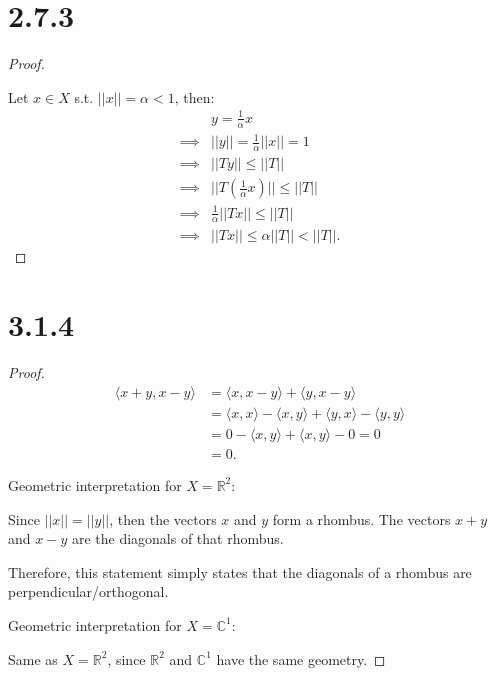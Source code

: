 \documentclass{article}
\begin{document}
\section*{2.7.3}
\begin{proof}
  $ $
  
  Let $x \in X$ s.t. $||x|| = \alpha < 1$, then:
  \begin{align*}
    &y = \frac{1}{\alpha} x \\
    \implies& ||y|| = \frac{1}{\alpha} ||x|| = 1 \\
    \implies& ||Ty|| \leq ||T|| \\
    \implies& ||T (\frac{1}{\alpha} x)|| \leq ||T|| \\
    \implies& \frac{1}{\alpha} ||Tx|| \leq ||T|| \\
    \implies& ||Tx|| \leq \alpha ||T|| < ||T||.
  \end{align*}
  
\end{proof}

\newpage


\section*{3.1.4}
\begin{proof}
  \begin{align*}
    \langle x+y, x-y \rangle 
    &= \langle x, x-y \rangle
    +
    \langle y, x-y \rangle \\
    &= \langle x, x \rangle - \langle x, y \rangle
    +
    \langle y, x \rangle - \langle y, y \rangle \\
    &= 0 - \langle x, y \rangle
    +
    \langle x, y \rangle - 0
    = 0 \\
    &= 0.
  \end{align*}

  Geometric interpretation for $X = \mathbb{R}^2$:
  
  \qquad Since $||x|| = ||y||$, then the vectors $x$ and $y$ form a rhombus. The vectors $x+y$ and $x-y$ are the diagonals of that rhombus.
  
  \qquad Therefore, this statement simply states that the diagonals of a rhombus are perpendicular/orthogonal.
  \newline

  Geometric interpretation for $X = \mathbb{C}^1$: 

  \qquad Same as $X = \mathbb{R}^2$, since $\mathbb{R}^2$ and $\mathbb{C}^1$ have the same geometry.




\end{proof}
\end{document}
